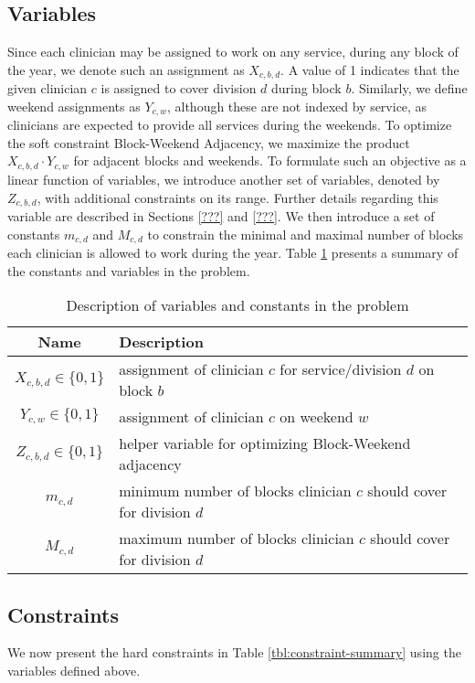 \subsection{Variables}
Since each clinician may be assigned to work on any service, during any block of the year, we denote such an assignment as $X_{c, b, d}$. A value of 1 indicates that the given clinician $c$ is assigned to cover division $d$ during block $b$. Similarly, we define weekend assignments as $Y_{c, w}$, although these are not indexed by service, as clinicians are expected to provide all services during the weekends. To optimize the soft constraint Block-Weekend Adjacency, we maximize the product $X_{c, b, d} \cdot Y_{c, w}$ for adjacent blocks and weekends. To formulate such an objective as a linear function of variables, we introduce another set of variables, denoted by $Z_{c, b, d}$, with additional constraints on its range. Further details regarding this variable are described in Sections \ref{???} and \ref{???}. We then introduce a set of constants $m_{c, d}$ and $M_{c, d}$ to constrain the minimal and maximal number of blocks each clinician is allowed to work during the year. Table \ref{tbl:variables-constants} presents a summary of the constants and variables in the problem.

\begin{table}[h]
	\centering
	\begin{tabular}{ c l }
		\hline
		\textbf{Name}              & \textbf{Description}                                                 \\ \hline
		$X_{c, b, d} \in \{0, 1\}$ & assignment of clinician $c$ for service/division $d$ on block $b$    \\
		$Y_{c, w} \in \{0, 1\}$    & assignment of clinician $c$ on weekend $w$                           \\
		$Z_{c, b, d} \in \{0, 1\}$ & helper variable for optimizing Block-Weekend adjacency               \\
		$m_{c, d}$                 & minimum number of blocks clinician $c$ should cover for division $d$ \\
		$M_{c, d}$                 & maximum number of blocks clinician $c$ should cover for division $d$
	\end{tabular}
	\caption{Description of variables and constants in the problem}
	\label{tbl:variables-constants}
\end{table}

\subsection{Constraints}
We now present the hard constraints in Table \ref{tbl:constraint-summary} using the variables defined above.

